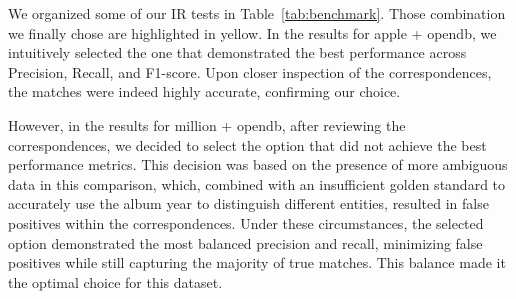 \documentclass[runningheads]{llncs}
\begin{document}
	We organized some of our IR tests in Table~\ref{tab:benchmark}. Those combination we finally chose are highlighted in yellow. In the results for apple + opendb, we intuitively selected the one that demonstrated the best performance across Precision, Recall, and F1-score. Upon closer inspection of the correspondences, the matches were indeed highly accurate, confirming our choice.

	However, in the results for million + opendb, after reviewing the correspondences, we decided to select the option that did not achieve the best performance metrics. This decision was based on the presence of more ambiguous data in this comparison, which, combined with an insufficient golden standard to accurately use the album year to distinguish different entities, resulted in false positives within the correspondences. Under these circumstances, the selected option demonstrated the most balanced precision and recall, minimizing false positives while still capturing the majority of true matches. This balance made it the optimal choice for this dataset.
\end{document}
